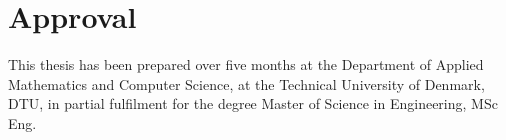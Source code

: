 \section*{Approval}
This thesis has been prepared over five months at the Department of Applied Mathematics and Computer Science, at the Technical University of Denmark, DTU, in partial fulfilment for the degree Master of Science in Engineering, MSc Eng. 


\vfill

\begin{center}
\namesigdate{\thesisauthor~-~\studentnumber}
\end{center}

\vfill

